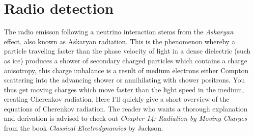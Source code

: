 \documentclass[11pt,a4paper,faculty=we,language=en,doctype=report]{cls/ugent-doc}
\begin{document}
\chapter{Radio detection}
The radio emisson following a neutrino interaction stems from the \textit{Askaryan} effect\cite{Askaryan}, also known as Askaryan radiation. This is the phenomenon whereby a particle traveling faster than the phase velocity of light in a dense dielectric (such as ice) produces a shower of secondary charged particles which contains a charge anisotropy, this charge imbalance is a result of medium electrons either Compton scattering into the advancing shower or annihilating with shower positrons. You thus get moving charges which move faster than the light speed in the medium, creating Cherenkov radiation.
Here I'll quickly give a short overview of the equations of Cherenkov radiation. The reader who wants a thorough explanation and derivation is advised to check out \textit{Chapter 14: Radiation by Moving Charges} from the book \textit{Classical Electrodynamics} by Jackson. 
\end{document}
